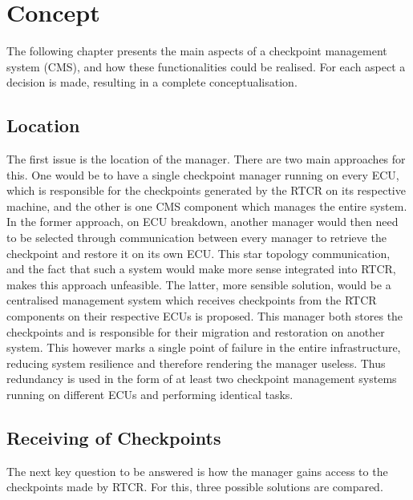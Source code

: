 
\chapter{Concept}\label{chapter:concept}
The following chapter presents the main aspects of a checkpoint management system (CMS), and how these functionalities could be realised. For each aspect a decision is made, resulting in a complete conceptualisation.
\section{Location}
The first issue is the location of the manager. There are two main approaches for this. One would be to have a single checkpoint manager running on every ECU, which is responsible for the checkpoints generated by the RTCR on its respective machine, and the other is one CMS component which manages the entire system. In the former approach, on ECU breakdown, another manager would then need to be selected through communication between every manager to retrieve the checkpoint and restore it on its own ECU. This star topology communication, and the fact that such a system would make more sense integrated into RTCR, makes this approach unfeasible. 
The latter, more sensible solution, would be a centralised management system which receives checkpoints from the RTCR components on their respective ECUs is proposed. This manager both stores the checkpoints and is responsible for their migration and restoration on another system. This however marks a single point of failure in the entire infrastructure, reducing system resilience and therefore rendering the manager useless. Thus redundancy is used in the form of at least two checkpoint management systems running on different ECUs and performing identical tasks. 
\section{Receiving of Checkpoints}
The next key question to be answered is how the manager gains access to the checkpoints made by RTCR. For this, three possible solutions are compared.
